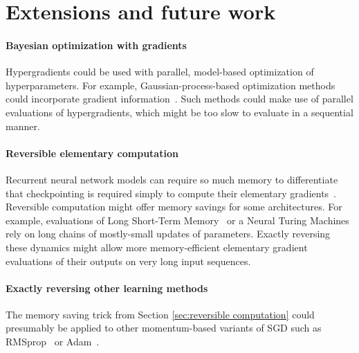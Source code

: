 \documentclass{article}
\newcommand{\primal}{elementary}
\begin{document}
\section{Extensions and future work}

\paragraph{Bayesian optimization with gradients}
Hypergradients could be used with parallel, model-based optimization of hyperparameters.
For example, Gaussian-process-based optimization methods %
 could incorporate gradient information~\cite{solak2003derivative}.
Such methods could make use of parallel evaluations of hypergradients, which might be too slow to evaluate in a sequential manner.

\paragraph{Reversible \primal{} computation}
Recurrent neural network models can require so much memory to differentiate that checkpointing is required simply to compute their \primal{} gradients~\citep{martens2012training}.
Reversible computation might offer memory savings for some architectures.
For example, evaluations of Long Short-Term Memory~\citep{hochreiter1997long} or a Neural Turing Machines~\citep{graves2014neural} rely on long chains of mostly-small updates of parameters.
Exactly reversing these dynamics might allow more memory-efficient \primal{} gradient evaluations of their outputs on very long input sequences. %

\paragraph{Exactly reversing other learning methods}
The memory saving trick from Section \ref{sec:reversible computation} could presumably be applied to other momentum-based variants of SGD such as RMSprop~\cite{Tieleman2012} or Adam~\citep{Adam14}.
\end{document}

